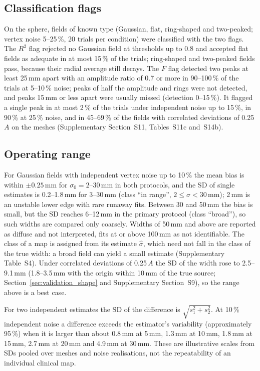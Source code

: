 \documentclass[a4paper,fleqn]{cas-dc}
\begin{document}
\subsection{Classification flags}\label{sec:validation_flags}
On the sphere, fields of known type (Gaussian, flat, ring-shaped and
two-peaked; vertex noise 5--25\,\%, 20 trials per condition) were
classified with the two flags.  The $R^2$ flag rejected no Gaussian field
at thresholds up to 0.8 and accepted flat fields as adequate in at most
15\,\% of the trials; ring-shaped and two-peaked fields pass, because
their radial average still decays.  The $F$ flag detected two peaks at
least 25\,mm apart with an amplitude ratio of 0.7 or more in
90--100\,\% of the trials at 5--10\,\% noise; peaks of half the
amplitude and rings were not detected, and peaks 15\,mm or less apart
were usually missed (detection 0--15\,\%).  It flagged a
single peak in at most 2\,\% of the trials under independent noise up to
15\,\%, in 90\,\% at 25\,\% noise, and in 45--69\,\% of the fields with
correlated deviations of 0.25\,$A$ on the meshes (Supplementary
Section~S11, Tables~S11c and~S14b).

\subsection{Operating range}\label{sec:validation_range}
For Gaussian fields with independent vertex noise up to 10\,\% the mean
bias is within $\pm 0.25$\,mm for $\sigma_0 = 2$--30\,mm in both
protocols, and the SD of single estimates is 0.2--1.8\,mm for 3--30\,mm
(class ``in range'', $2 \le \sigma < 30$\,mm); 2\,mm is an unstable lower
edge with rare runaway fits.  Between 30 and 50\,mm the bias is small,
but the SD reaches 6--12\,mm in the primary protocol (class
``broad''), so such widths are
compared only coarsely.  Widths of 50\,mm and above are reported as
diffuse and not interpreted, fits at or above 100\,mm as not
identifiable.  The class of a map is assigned from its estimate
$\hat\sigma$, which need not fall in the class of the true width: a
broad field can yield a small estimate (Supplementary Table~S4).  Under
correlated deviations of 0.25\,$A$ the SD of the width rose to
2.5--9.1\,mm (1.8--3.5\,mm with the origin within 10\,mm of the true
source; Section~\ref{sec:validation_shape} and Supplementary
Section~S9), so the range above is a best case.

For two independent estimates the SD of the difference is
$\sqrt{s_1^2 + s_2^2}$.  At 10\,\% independent noise a difference
exceeds the estimator's variability (approximately 95\,\%) when it is
larger than about 0.8\,mm at 5\,mm, 1.3\,mm at 10\,mm, 1.8\,mm at
15\,mm, 2.7\,mm at 20\,mm and 4.9\,mm at 30\,mm.  These are illustrative
scales from SDs pooled over meshes and noise realisations, not the
repeatability of an individual clinical map.
\end{document}
